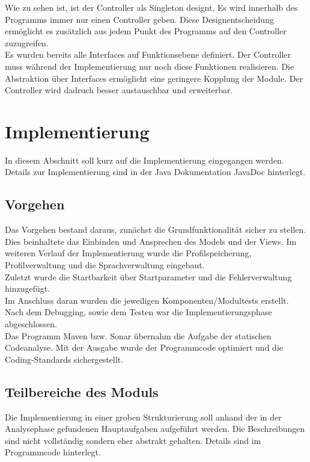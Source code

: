   Wie zu sehen ist, ist der Controller als Singleton designt. Es wird innerhalb des Programms immer nur einen Controller geben. Diese Designentscheidung ermöglicht es zusätzlich aus jedem Punkt des Programms auf den Controller zuzugreifen.
 \\Es wurden bereits alle Interfaces auf Funktionsebene definiert. Der Controller muss während der Implementierung nur noch diese Funktionen realisieren.
 Die Abstraktion über Interfaces ermöglicht eine geringere Kopplung der Module. Der Controller wird dadruch besser austauschbar und erweiterbar.

\chapter{Implementierung}
In diesem Abschnitt soll kurz auf die Implementierung eingegangen werden.
Details zur Implementierung sind in der Java Dokumentation JavaDoc hinterlegt.

\section{Vorgehen}
Das Vorgehen bestand daraus, zunächst die Grundfunktionalität sicher zu stellen. Dies beinhaltete das Einbinden und Ansprechen des Models und der Views.
Im weiteren Verlauf der Implementierung wurde die Profilspeicherung, Profilverwaltung und die Sprachverwaltung eingebaut.\\
Zuletzt wurde die Startbarkeit über Startparameter und die Fehlerverwaltung hinzugefügt.\\
Im Anschluss daran wurden die jeweiligen Komponenten/Modultests erstellt. Nach dem Debugging, sowie dem Testen war die Implementierungsphase abgeschlossen.\\
Das Programm Maven bzw. Sonar übernahm die Aufgabe der statischen Codeanalyse. Mit der Ausgabe wurde der Programmcode optimiert und die Coding-Standards sichergestellt.

\section{Teilbereiche des Moduls}
Die Implementierung in einer groben Strukturierung soll anhand der in der Analysephase gefundenen Hauptaufgaben aufgeführt werden.
Die Beschreibungen sind nicht vollständig sondern eher abstrakt gehalten. Details sind im Programmcode hinterlegt.\\

